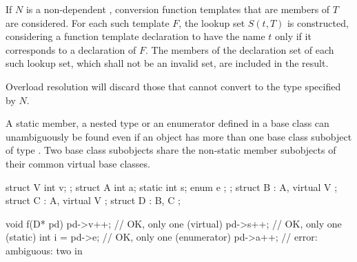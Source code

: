 \pnum
If $N$ is a non-dependent ,
conversion function templates that are members of $T$ are considered.
For each such template $F$, the lookup set $S(t,T)$ is constructed,
considering a function template declaration to have the name $t$
only if it corresponds to a declaration of $F$.
The members of the declaration set of each such lookup set,
which shall not be an invalid set, are included in the result.
\begin{note}
Overload resolution will discard those
that cannot convert to the type specified by $N$.
\end{note}

\pnum
\begin{note}
A static member, a nested type or an enumerator defined in a base class
 can unambiguously be found even if an object has more than one
base class subobject of type . Two base class subobjects share
the non-static member subobjects of their common virtual base classes.
\end{note}
\begin{example}
\begin{codeblock}
struct V {
  int v;
};
struct A {
  int a;
  static int s;
  enum { e };
};
struct B : A, virtual V { };
struct C : A, virtual V { };
struct D : B, C { };

void f(D* pd) {
  pd->v++;          // OK, only one  (virtual)
  pd->s++;          // OK, only one  (static)
  int i = pd->e;    // OK, only one  (enumerator)
  pd->a++;          // error: ambiguous: two  in 
}
\end{codeblock}
\end{example}

